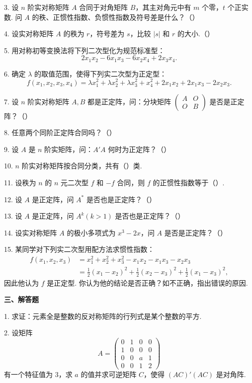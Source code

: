 \documentclass[UTF8, 12pt, fontset=fandol, oneside]{ctexart}
\begin{document}
3. 设 $n$ 阶实对称矩阵 $A$ 合同于对角矩阵 $B$，其主对角元中有 $m$ 个零，$t$ 个正实数. 问 $A$ 的秩、正惯性指数、负惯性指数及符号差是什么？（\quad ）

4. 设实对称矩阵 $A$ 的秩为 $r$，符号差为 $s$，比较 $|s|$ 和 $r$ 的大小.（\quad ）

5. 用对称初等变换法将下列二次型化为规范标准型：
\[
2x_1x_2-6x_1x_3-6x_2x_4+2x_3x_4.
\]

6. 确定 $\lambda$ 的取值范围，使得下列实二次型为正定型：
\[
f(x_1,x_2,x_3,x_4)=\lambda x_1^2+\lambda x_2^2+\lambda x_3^2+x_4^2+2x_1x_2+2x_1x_3-2x_2x_3.
\]

7. 设 $n$ 阶实对称矩阵 $A,B$ 都是正定阵，问：分块矩阵 $\left(\begin{array}{cc}A&O\\ O&B\end{array}\right)$ 是否是正定阵？（\quad ）

8. 任意两个同阶正定阵合同吗？（\quad ）

9. 设 $A$ 是 $n$ 阶实矩阵，问：$A'A$ 何时为正定阵？（\quad ）

10. $n$ 阶实对称矩阵按合同分类，共有（\quad ）类.

11. 设秩为 $n$ 的 $n$ 元二次型 $f$ 和 $-f$ 合同，则 $f$ 的正惯性指数等于（\quad ）.

12. 设 $A$ 是正定阵，问 $A^*$ 是否也是正定阵？（\quad ）

13. 设 $A$ 是正定阵，问 $A^k(k>1)$ 是否也是正定阵？（\quad ）

14. 设实对称矩阵 $A$ 的极小多项式为 $x^3-2x$，问 $A$ 是否是正定阵？（\quad ）

15. 某同学对下列实二次型用配方法求惯性指数：
\[
\begin{aligned}
f(x_1,x_2,x_3)&=x_1^2+x_2^2+x_3^2-x_1x_2-x_1x_3-x_2x_3\\
&=\frac12(x_1-x_2)^2+\frac12(x_2-x_3)^2+\frac12(x_1-x_3)^2,
\end{aligned}
\]
因此他认为 $f$ 是正定型. 你认为他的结论是否正确？如不正确，指出错误的原因.

\noindent\textbf{三、解答题}

1. 求证：元素全是整数的反对称矩阵的行列式是某个整数的平方.

2. 设矩阵
\[
A=\left(\begin{array}{cccc}
0 & 1 & 0 & 0\\
1 & 0 & 0 & 0\\
0 & 0 & a & 1\\
0 & 0 & 1 & 2
\end{array}\right)
\]
有一个特征值为 $3$，求 $a$ 的值并求可逆矩阵 $C$，使得 $(AC)'(AC)$ 是对角阵.
\end{document}
